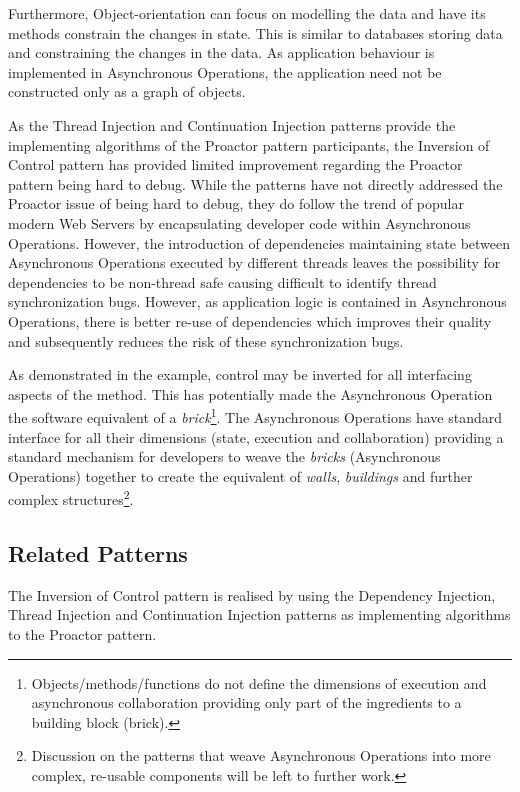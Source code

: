 \documentclass[prodmode]{style/acmlarge}
\begin{document}
Furthermore, Object-orientation can focus on modelling the data and have its
methods constrain the changes in state.  This is similar to databases storing
data and constraining the changes in the data.  As application behaviour is
implemented in Asynchronous Operations, the application need not be constructed
only as a graph of objects.

As the Thread Injection and Continuation Injection patterns provide the
implementing algorithms of the Proactor pattern participants, the Inversion of
Control pattern has provided limited improvement regarding the Proactor pattern
being hard to debug.  While the patterns have not directly addressed the
Proactor issue of being hard to debug, they do follow the trend of popular
modern Web Servers by encapsulating developer code within Asynchronous
Operations.  However, the introduction of dependencies maintaining state between
Asynchronous Operations executed by different threads leaves the possibility for
dependencies to be non-thread safe causing difficult to identify thread
synchronization bugs.  However, as application logic is contained in
Asynchronous Operations, there is better re-use of dependencies which improves
their quality and subsequently reduces the risk of these synchronization bugs.

As demonstrated in the example, control may be inverted for all interfacing
aspects of the method.  This has potentially made the Asynchronous Operation the
software equivalent of a \textit{brick}\footnote{Objects/methods/functions do
not define the dimensions of execution and asynchronous collaboration providing
only part of the ingredients to a building block (brick).}.  The Asynchronous
Operations have standard interface for all their dimensions (state, execution
and collaboration) providing a standard mechanism for developers to weave the
\textit{bricks} (Asynchronous Operations) together to create the equivalent of
\textit{walls}, \textit{buildings} and further complex
structures\footnote{Discussion on the patterns that weave Asynchronous
Operations into more complex, re-usable components will be left to further
work.}.


\subsection{Related Patterns}

The Inversion of Control pattern is realised by using the Dependency Injection,
Thread Injection and Continuation Injection patterns as implementing algorithms
to the Proactor pattern.
\end{document}
